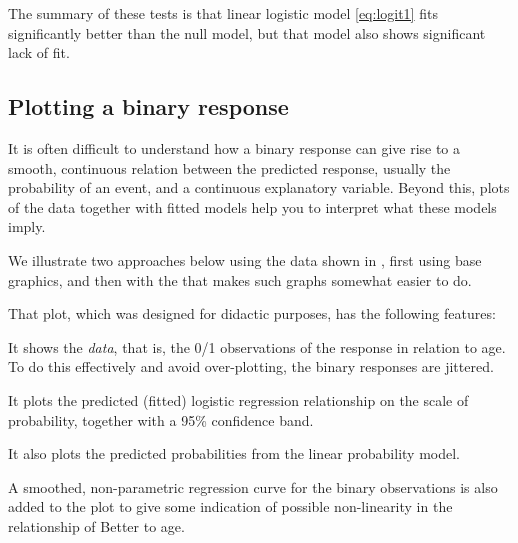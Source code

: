 \documentclass[11pt]{book}\usepackage[]{graphicx}\usepackage[]{color}
\begin{document}
\begin{itemize}
The summary of these tests is that linear logistic model \eqref{eq:logit1}
fits significantly better than the null model, but that model also shows
significant lack of fit.
\end{itemize}



\subsection{Plotting a binary response}\label{sec:logist-plotting}

It is often difficult to understand how a binary response can give rise to
a smooth, continuous relation between the predicted response, usually
the probability of an event, and a continuous explanatory variable.
Beyond this, plots of the data together with fitted models 
help you to interpret what these models imply.

We illustrate two approaches below using the  data
shown in , first using \R base graphics, and
then with the  that makes such graphs somewhat easier to do.

That plot, which was designed for didactic purposes, has the following features:
\begin{itemize*}
  \item It shows the \emph{data}, that is, the 0/1 observations of the 
  response in relation to age. To do this effectively and avoid over-plotting, the
  binary responses are jittered.
  \item It plots the predicted (fitted) logistic regression relationship on the scale
  of probability, together with a 95\% confidence band.
  \item It also plots the predicted probabilities from the linear probability model.
  \item A smoothed, non-parametric regression curve for the binary observations
  is also added to the plot to give some indication of possible non-linearity in
  the relationship of Better to age.
\end{itemize*}
\end{document}
